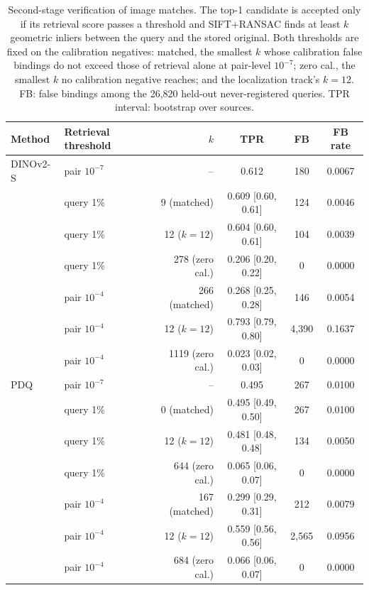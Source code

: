 \begin{table}[!t]
\centering
\footnotesize
\caption{Second-stage verification of image matches. The top-1 candidate is accepted only if its retrieval score passes a threshold and SIFT+RANSAC finds at least $k$ geometric inliers between the query and the stored original. Both thresholds are fixed on the calibration negatives: matched, the smallest $k$ whose calibration false bindings do not exceed those of retrieval alone at pair-level $10^{-7}$; zero cal., the smallest $k$ no calibration negative reaches; and the localization track's $k=12$. FB: false bindings among the 26{,}820 held-out never-registered queries. TPR interval: bootstrap over sources.}
\label{tab:fp-verify}
\setlength{\tabcolsep}{3pt}
\begin{tabular}{llrccc}
\toprule
Method & Retrieval threshold & $k$ & TPR & FB & FB rate \\
\midrule
DINOv2-S & pair $10^{-7}$ & -- & 0.612 & 180 & 0.0067 \\
 & query 1\% & 9 (matched) & 0.609 \tiny[0.60, 0.61] & 124 & 0.0046 \\
 & query 1\% & 12 ($k=12$) & 0.604 \tiny[0.60, 0.61] & 104 & 0.0039 \\
 & query 1\% & 278 (zero cal.) & 0.206 \tiny[0.20, 0.22] & 0 & 0.0000 \\
 & pair $10^{-4}$ & 266 (matched) & 0.268 \tiny[0.25, 0.28] & 146 & 0.0054 \\
 & pair $10^{-4}$ & 12 ($k=12$) & 0.793 \tiny[0.79, 0.80] & 4{,}390 & 0.1637 \\
 & pair $10^{-4}$ & 1119 (zero cal.) & 0.023 \tiny[0.02, 0.03] & 0 & 0.0000 \\
\addlinespace
PDQ & pair $10^{-7}$ & -- & 0.495 & 267 & 0.0100 \\
 & query 1\% & 0 (matched) & 0.495 \tiny[0.49, 0.50] & 267 & 0.0100 \\
 & query 1\% & 12 ($k=12$) & 0.481 \tiny[0.48, 0.48] & 134 & 0.0050 \\
 & query 1\% & 644 (zero cal.) & 0.065 \tiny[0.06, 0.07] & 0 & 0.0000 \\
 & pair $10^{-4}$ & 167 (matched) & 0.299 \tiny[0.29, 0.31] & 212 & 0.0079 \\
 & pair $10^{-4}$ & 12 ($k=12$) & 0.559 \tiny[0.56, 0.56] & 2{,}565 & 0.0956 \\
 & pair $10^{-4}$ & 684 (zero cal.) & 0.066 \tiny[0.06, 0.07] & 0 & 0.0000 \\
\bottomrule
\end{tabular}

\end{table}
